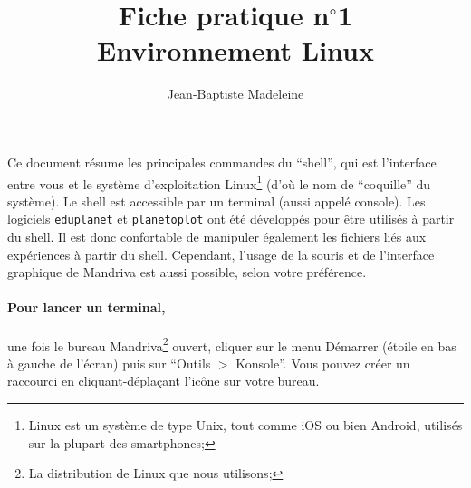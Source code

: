 \documentclass[a4paper,10pt]{article}
\begin{document}

\title{\textbf{Fiche pratique n$^\circ$1}\\
Environnement Linux}
\author{\normalsize{Jean-Baptiste Madeleine}}
\date{}

\maketitle

\thispagestyle{empty}

Ce document résume les principales commandes du ``shell'', qui est l'interface
entre vous et le système d'exploitation Linux\footnote{Linux est un système de
type Unix, tout comme iOS ou bien Android, utilisés sur la plupart des
smartphones;} (d'où le nom de ``coquille'' du système). Le shell est accessible
par un terminal (aussi appelé console). Les logiciels \texttt{eduplanet} et
\texttt{planetoplot} ont été développés pour
être utilisés à partir du shell. Il est donc confortable de manipuler également
les fichiers liés aux expériences à partir du shell. Cependant, l'usage de la
souris et de l'interface graphique de Mandriva est aussi possible, selon votre
préférence.

\paragraph{Pour lancer un terminal,} une fois le bureau Mandriva\footnote{La
distribution de Linux que nous utilisons;} ouvert, cliquer sur le menu Démarrer
(étoile en bas à gauche de l'écran) puis sur ``Outils $>$ Konsole''. Vous
pouvez créer un raccourci en cliquant-déplaçant l'icône sur votre bureau.
\end{document}
